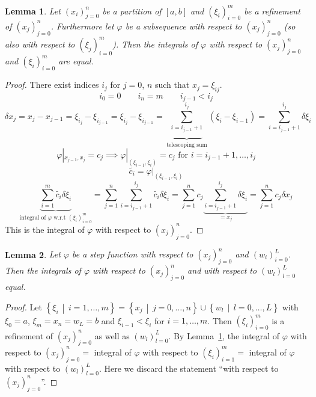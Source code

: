 \documentclass{article}
\newtheorem{lemma}{Lemma}  \numberwithin{lemma}{section}
\newcommand{\setdef}[2]{\left\{\left.#1\,\middle|\,#2\right.\right\}}
\begin{document}
\begin{lemma} %
  \label{lemma2}
  Let $(x_i)_{j=0}^n$ be a partition of $[a,b]$ and $(\xi_i)_{i=0}^m$ be a refinement of $(x_j)_{j=0}^n$.
  Furthermore let $\varphi$ be a subsequence with respect to $(x_j)_{j=0}^n$ (so also with respect to $(\xi_j)_{i=0}^m$).
  Then the integrals of $\varphi$ with respect to $(x_j)_{j=0}^n$ and $(\xi_i)_{i=0}^m$ are equal.
\end{lemma}

\begin{proof}
  There exist indices $i_j$ for $j=0$, $n$ such that $x_j = \xi_{ij}$.
  \[ i_0 = 0 \qquad i_n = m \qquad i_{j-1} < i_j \]
  \[ \delta x_j = x_j - x_{j-1} = \xi_{i_j} - \xi_{i_{j-1}} = \xi_{i_j} - \xi_{i_{j-1}} = \underbrace{\sum_{i=i_{j-1}+1}^{i_j}}_{\text{telescoping sum}} (\xi_i - \xi_{i-1}) = \sum_{i=i_{j-1}+1}^{i_j} \delta \xi_i \]
  \[ \varphi|_{x_{j-1},x_j} = c_j \implies \varphi|_{(\xi_{i-1},\xi_i)} = c_j \text{ for } i = i_{j-1}+1, \dots, i_j \]
  \[ \tilde{c_i} = \varphi|_{(\xi_{i-1},\xi_i)} \]
  \[ \underbrace{\sum_{i=1}^m \tilde{c_i} \delta \xi_i}_{\text{integral of $\varphi$ w.r.t $(\xi_i)_{i=0}^m$}} = \sum_{j=1}^n \sum_{i=i_{j-1}+1}^{i_j} \tilde{c_i} \delta \xi_i = \sum_{j=1}^n c_j \underbrace{\sum_{i=i_{j-1}+1}^{i_j} \delta \xi_i}_{=  x_j} = \sum_{j=1}^n c_j \delta x_j \]
  This is the integral of $\varphi$ with respect to $(x_j)_{j=0}^n$.
\end{proof}

\begin{lemma} %
  \label{lemma3}
  Let $\varphi$ be a step function with respect to $(x_j)_{j=0}^n$ and $(w_i)_{i=0}^L$.
  Then the integrals of $\varphi$ with respect to $(x_j)_{j=0}^n$ and with respect to $(w_l)_{l=0}^L$ equal.
\end{lemma}

\begin{proof}
  Let $\setdef{\xi_i}{i = 1, \dots, m} = \setdef{x_j}{j = 0, \dots, n} \cup \setdef{w_l}{l = 0, \dots, L}$
  with $\xi_0 = a$, $\xi_m = x_n = w_L = b$ and $\xi_{i-1} < \xi_i$ for $i = 1, \dots, m$.
  Then $(\xi_i)_{i=0}^m$ is a refinement of $(x_j)_{j=0}^n$ as well as $(w_l)_{l=0}^L$.
  By Lemma~\ref{lemma2}, the integral of $\varphi$ with respect to $(x_j)_{j=0}^n =$ integral of $\varphi$
  with respect to $(\xi_i)_{i=1}^m =$ integral of $\varphi$ with respect to $(w_l)_{l=0}^L$.
  Here we discard the statement \enquote{with respect to $(x_j)_{j=0}^n$}.
\end{proof}
\end{document}
